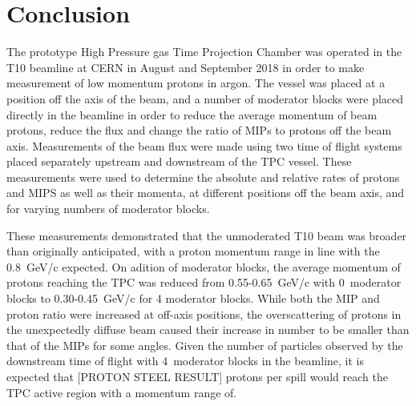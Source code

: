\section{Conclusion}
\label{hptpcPaper:sec:Conclusion}

The prototype High Pressure gas Time Projection Chamber was operated in the T10 beamline at CERN in August and September 2018 in order to make measurement of low momentum protons in argon.
The vessel was placed at a position off the axis of the beam, and a number of moderator blocks were placed directly in the beamline in order to reduce the average momentum of beam protons, reduce the flux and change the ratio of MIPs to protons off the beam axis.
Measurements of the beam flux were made using two time of flight systems placed separately upstream and downstream of the TPC vessel.
These measurements were used to determine the absolute and relative rates of protons and MIPS as well as their momenta, at different positions off the beam axis, and for varying numbers of moderator blocks.

These measurements demonstrated that the unmoderated T10 beam was broader than originally anticipated, with a proton momentum range in line with the 0.8~GeV/c expected.
On adition of moderator blocks, the average momentum of protons reaching the TPC was reduced from 0.55-0.65~GeV/c with 0~moderator blocks to 0.30-0.45~GeV/c for 4 moderator blocks.
While both the MIP and proton ratio were increased at off-axis positions, the overscattering of protons in the unexpectedly diffuse beam caused their increase in number to be smaller than that of the MIPs for some angles.
Given the number of particles observed by the downstream time of flight with 4~moderator blocks in the beamline, it is expected that [PROTON STEEL RESULT] protons per spill would reach the TPC active region with a momentum range of.

